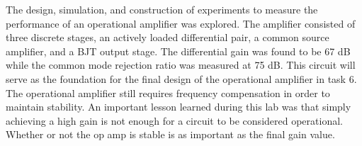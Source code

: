 

The design, simulation, and construction of experiments to measure the performance of an operational amplifier was explored. The amplifier consisted of three discrete stages, an actively loaded differential pair, a common source amplifier, and a BJT output stage. The differential gain was found to be 67 dB while the common mode rejection ratio was measured at 75 dB. This circuit will serve as the foundation for the final design of the operational amplifier in task 6. The operational amplifier still requires frequency compensation in order to maintain stability. An important lesson learned during this lab was that simply achieving a high gain is not enough for a circuit to be considered operational. Whether or not the op amp is stable is as important as the final gain value.
